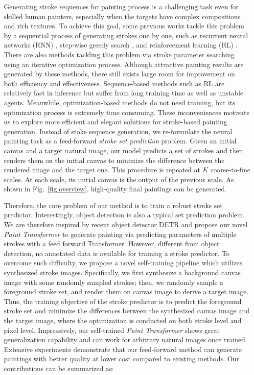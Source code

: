 \documentclass[10pt,twocolumn,letterpaper]{article}
\begin{document}
Generating stroke sequences for painting process is a challenging task even for skilled human painters, especially when the targets have complex compositions and rich textures.
To achieve this goal, some previous works tackle this problem by a sequential process of generating strokes one by one, such as recurrent neural networks (RNN) \cite{zheng2018strokenet,ha2017neural}, step-wise greedy search \cite{haeberli1990paint,litwinowicz1997processing}, and reinforcement learning (RL) \cite{ganin2018synthesizing,zhou2018learning,xie2013artist,huang2019learning,nakano2019neural}.
There are also methods \cite{zou2020stylized,kotovenko_cvpr_2021} tackling this problem via stroke parameter searching using an iterative optimization process.
Although attractive painting results are generated by these methods, there still exists large room for improvement on both efficiency and effectiveness. Sequence-based methods such as RL are relatively fast in inference but suffer from long training time as well as unstable agents. Meanwhile, optimization-based methods \cite{zou2020stylized,kotovenko_cvpr_2021} do not need training, but its optimization process is extremely time consuming. 
These inconveniences motivate us to explore more efficient and elegant solutions for stroke-based painting generation.
Instead of stoke sequence generation, we re-formulate the neural painting task as a feed-forward \emph{stroke set prediction} problem. 
Given an initial canvas and a target natural image, our model predicts a set of strokes and then renders them on the initial canvas to minimize the difference between the rendered image and the target one. This procedure is repeated at $K$ coarse-to-fine scales. At each scale, its initial canvas is the output of the previous scale. As shown in Fig.~\ref{fig:overview}, high-quality final paintings can be generated.




Therefore, the core problem of our method is to train a robust stroke set predictor. 
Interestingly, object detection is also a typical set prediction problem. We are therefore inspired by recent object detector DETR \cite{carion2020endtoend} and propose our novel \textit{Paint Transformer} to generate painting via predicting parameters of multiple strokes with a feed forward Transformer.
However, different from object detection, no annotated data is available for training a stroke predictor.
To overcome such difficulty, we propose a novel self-training pipeline which utilizes synthesized stroke images. Specifically, we first synthesize a background canvas image with some randomly sampled strokes; then, we randomly sample a foreground stroke set, and render them on canvas image to derive a target image.
Thus, the training objective of the stroke predictor is to predict the foreground stroke set and minimize the differences between the synthesized canvas image and the target image, where the optimization is conducted on both stroke level and pixel level.
Impressively, our self-trained \emph{Paint Transformer} shows great generalization capability and can work for arbitrary natural images once trained.
Extensive experiments demonstrate that our feed-forward method can generate paintings with better quality at lower cost compared to existing methods.
Our contributions can be summarized as:
\end{document}
